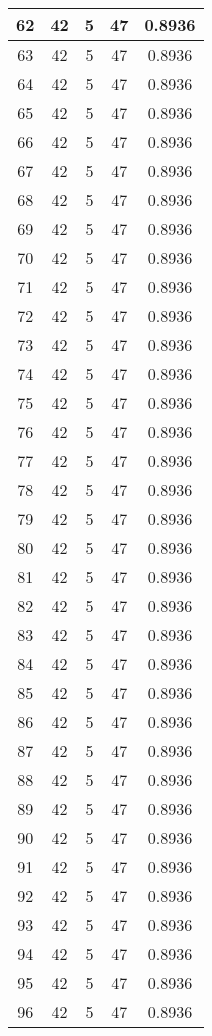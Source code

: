 \documentclass[letterpaper, 12pt]{article}
\begin{document}
\begin{longtable}{|c|c|c|c|c|}
\hline
62 & 42 & 5 & 47 & 0.8936 \\
\hline
63 & 42 & 5 & 47 & 0.8936 \\
\hline
64 & 42 & 5 & 47 & 0.8936 \\
\hline
65 & 42 & 5 & 47 & 0.8936 \\
\hline
66 & 42 & 5 & 47 & 0.8936 \\
\hline
67 & 42 & 5 & 47 & 0.8936 \\
\hline
68 & 42 & 5 & 47 & 0.8936 \\
\hline
69 & 42 & 5 & 47 & 0.8936 \\
\hline
70 & 42 & 5 & 47 & 0.8936 \\
\hline
71 & 42 & 5 & 47 & 0.8936 \\
\hline
72 & 42 & 5 & 47 & 0.8936 \\
\hline
73 & 42 & 5 & 47 & 0.8936 \\
\hline
74 & 42 & 5 & 47 & 0.8936 \\
\hline
75 & 42 & 5 & 47 & 0.8936 \\
\hline
76 & 42 & 5 & 47 & 0.8936 \\
\hline
77 & 42 & 5 & 47 & 0.8936 \\
\hline
78 & 42 & 5 & 47 & 0.8936 \\
\hline
79 & 42 & 5 & 47 & 0.8936 \\
\hline
80 & 42 & 5 & 47 & 0.8936 \\
\hline
81 & 42 & 5 & 47 & 0.8936 \\
\hline
82 & 42 & 5 & 47 & 0.8936 \\
\hline
83 & 42 & 5 & 47 & 0.8936 \\
\hline
84 & 42 & 5 & 47 & 0.8936 \\
\hline
85 & 42 & 5 & 47 & 0.8936 \\
\hline
86 & 42 & 5 & 47 & 0.8936 \\
\hline
87 & 42 & 5 & 47 & 0.8936 \\
\hline
88 & 42 & 5 & 47 & 0.8936 \\
\hline
89 & 42 & 5 & 47 & 0.8936 \\
\hline
90 & 42 & 5 & 47 & 0.8936 \\
\hline
91 & 42 & 5 & 47 & 0.8936 \\
\hline
92 & 42 & 5 & 47 & 0.8936 \\
\hline
93 & 42 & 5 & 47 & 0.8936 \\
\hline
94 & 42 & 5 & 47 & 0.8936 \\
\hline
95 & 42 & 5 & 47 & 0.8936 \\
\hline
96 & 42 & 5 & 47 & 0.8936 \\

\end{longtable}
\end{document}
